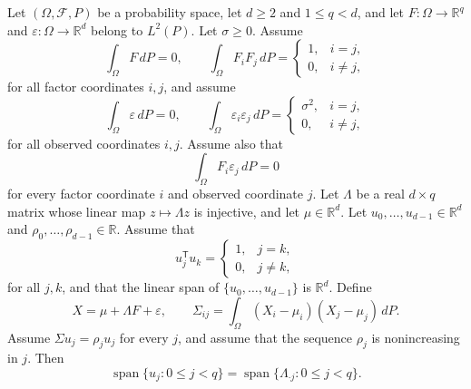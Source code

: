 \begin{theorem}
Let $(\Omega,\mathcal F,P)$ be a probability space, let $d\geq2$ and
$1\leq q<d$, and let $F:\Omega\to\mathbb R^q$ and
$\varepsilon:\Omega\to\mathbb R^d$ belong to $L^2(P)$.  Let
$\sigma\geq0$.  Assume
\[
  \int_\Omega F\,dP=0,
  \qquad
  \int_\Omega F_iF_j\,dP=
  \begin{cases}1,&i=j,\\0,&i\ne j,\end{cases}
\]
for all factor coordinates $i,j$, and assume
\[
  \int_\Omega \varepsilon\,dP=0,
  \qquad
  \int_\Omega \varepsilon_i\varepsilon_j\,dP=
  \begin{cases}\sigma^2,&i=j,\\0,&i\ne j,\end{cases}
\]
for all observed coordinates $i,j$.  Assume also that
\[
  \int_\Omega F_i\varepsilon_j\,dP=0
\]
for every factor coordinate $i$ and observed coordinate $j$.
Let $\Lambda$ be a real $d\times q$ matrix whose linear map
$z\mapsto\Lambda z$ is injective, and let $\mu\in\mathbb R^d$.  Let
$u_0,\ldots,u_{d-1}\in\mathbb R^d$ and
$\rho_0,\ldots,\rho_{d-1}\in\mathbb R$.  Assume that
\[
  u_j^{\mathsf T}u_k=
  \begin{cases}1,&j=k,\\0,&j\ne k,\end{cases}
\]
for all $j,k$, and that the linear span of $\{u_0,\ldots,u_{d-1}\}$ is
$\mathbb R^d$.  Define
\[
  X=\mu+\Lambda F+\varepsilon,
  \qquad
  \Sigma_{ij}=\int_\Omega (X_i-\mu_i)(X_j-\mu_j)\,dP.
\]
Assume $\Sigma u_j=\rho_j u_j$ for every $j$, and assume that the sequence
$\rho_j$ is nonincreasing in $j$.  Then
\[
  \operatorname{span}\{u_j:0\leq j<q\}
  =
  \operatorname{span}\{\Lambda_{\cdot j}:0\leq j<q\}.
\]
\end{theorem}
